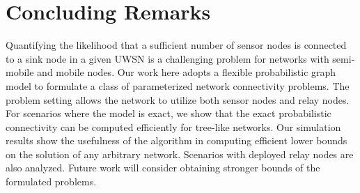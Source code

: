 \documentclass[letterpaper,conference,fleqn]{IEEEtran}
\begin{document}








\section {Concluding Remarks}
%
Quantifying the likelihood that a sufficient number of sensor nodes
is connected to a sink node in a given UWSN is a challenging problem for
networks with semi-mobile and mobile nodes.
%
Our work here adopts a flexible probabilistic graph model to formulate
a class of parameterized network connectivity problems.
%
The problem setting allows the network to utilize both sensor nodes
and relay nodes.
%
For scenarios where the model is exact, we show that the exact
probabilistic connectivity can be computed efficiently for tree-like
networks.
%
Our simulation results show the usefulness of the algorithm in
computing efficient lower bounds on the solution of any arbitrary
network. Scenarios with deployed relay nodes are also analyzed.
%
Future work will consider obtaining stronger bounds of the formulated
problems.



%





\end{document}
